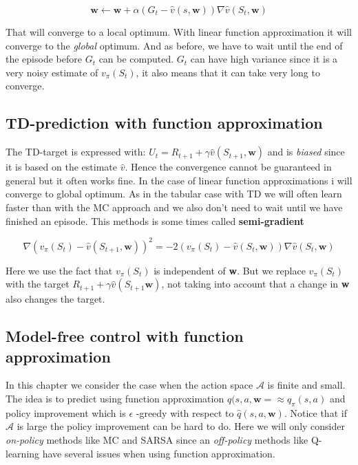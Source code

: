 	\begin{equation}
		\textbf{w} \leftarrow \textbf{w} + \alpha (G_t - \hat{v}(s, \textbf{w}))\nabla \hat{v}(S_t, \textbf{w})
	\end{equation} 

That will converge to a local optimum. With linear function approximation it will converge to the \emph{global} optimum. And as before, we have to wait until the end of the episode before $G_t$ can be computed. $G_t$ can have high variance since it is a very noisy estimate of $v_\pi(S_t)$, it also means that it can take very long to converge.

\subsection*{TD-prediction with function approximation}
The TD-target is expressed with: $U_t = R_{t+1} + \gamma \hat{v}(S_{t+1}, \textbf{w})$ and is \emph{biased} since it is based on the estimate $\hat{v}$. Hence the convergence cannot be guaranteed in general but it often works fine. In the case of linear function approximations i will converge to global optimum. As in the tabular case with TD we will often learn faster than with the MC approach and we also don't need to wait until we have finished an episode. This methods is some times called \textbf{semi-gradient}

	\begin{equation}
		\nabla (v_\pi(S_t) - \hat{v}(S_{t+1},\textbf{w}))^{2} = -2 (v_\pi(S_t) - \hat{v}(S_t, \textbf{w}))\nabla \hat{v}(S_t,\textbf{w})
	\end{equation}

Here we use the fact that $v_\pi(S_t)$ is independent of \textbf{w}. But we replace $v_\pi(S_t)$ with the target $R_{t+1} + \gamma \hat{v}(S_{t+1} \textbf{w})$, not taking into account that a change in \textbf{w} also changes the target.

\subsection*{Model-free control with function approximation}
In this chapter we consider the case when the action space $\mathcal{A}$ is finite and small. The idea is to predict using function approximation $\hat{q}(s,a,\textbf{w}= \approx q_\pi(s,a)$ and policy improvement which is $\epsilon$ 
-greedy with respect to $\hat{q}(s,a,\textbf{w})$. Notice that if $\mathcal{A}$ is large the policy improvement can be hard to do. Here we will only consider \emph{on-policy} methods like MC and SARSA since an \emph{off-policy} methods like Q-learning have several issues when using function approximation.

